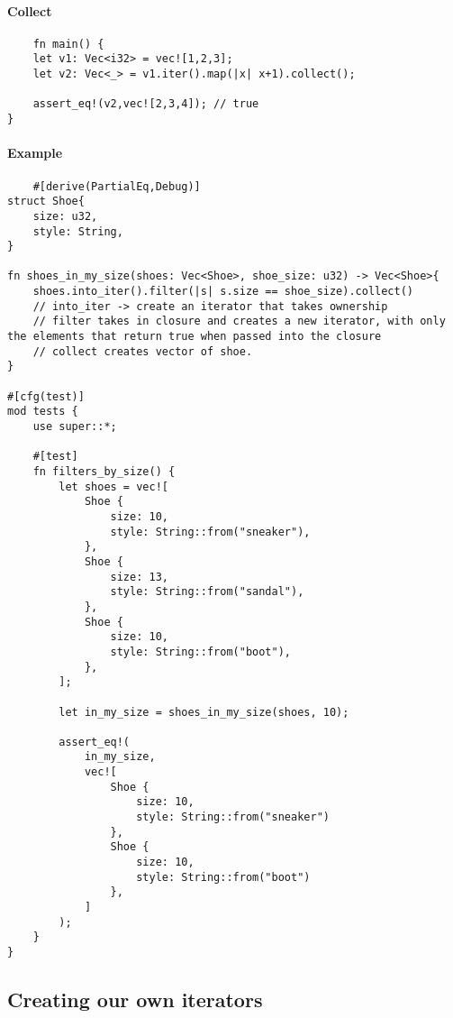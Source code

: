 \paragraph*{Collect}\begin{lstlisting}
    fn main() {
    let v1: Vec<i32> = vec![1,2,3];
    let v2: Vec<_> = v1.iter().map(|x| x+1).collect();

    assert_eq!(v2,vec![2,3,4]); // true
}
\end{lstlisting}

\paragraph*{Example}\begin{lstlisting}
    #[derive(PartialEq,Debug)]
struct Shoe{
    size: u32,
    style: String,
}

fn shoes_in_my_size(shoes: Vec<Shoe>, shoe_size: u32) -> Vec<Shoe>{
    shoes.into_iter().filter(|s| s.size == shoe_size).collect()
    // into_iter -> create an iterator that takes ownership
    // filter takes in closure and creates a new iterator, with only the elements that return true when passed into the closure
    // collect creates vector of shoe.
}

#[cfg(test)]
mod tests {
    use super::*;

    #[test]
    fn filters_by_size() {
        let shoes = vec![
            Shoe {
                size: 10,
                style: String::from("sneaker"),
            },
            Shoe {
                size: 13,
                style: String::from("sandal"),
            },
            Shoe {
                size: 10,
                style: String::from("boot"),
            },
        ];

        let in_my_size = shoes_in_my_size(shoes, 10);

        assert_eq!(
            in_my_size,
            vec![
                Shoe {
                    size: 10,
                    style: String::from("sneaker")
                },
                Shoe {
                    size: 10,
                    style: String::from("boot")
                },
            ]
        );
    }
}
\end{lstlisting}

\subsection{Creating our own iterators}

